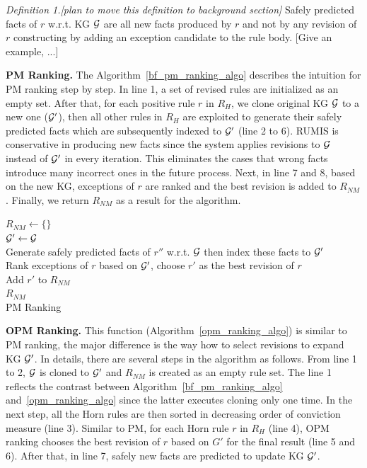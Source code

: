 \textit{Definition 1.[plan to move this definition to background section]} Safely predicted facts of $r$ w.r.t. KG $\mathcal{G}$ are all new facts produced by $r$ and not by any revision of $r$ constructing by adding an exception candidate to the rule body. [Give an example, ...]

\textbf{PM Ranking.} The Algorithm~\ref{bf_pm_ranking_algo} describes the intuition for PM ranking step by step. In line 1, a set of revised rules are initialized as an empty set. After that, for each positive rule $r$ in $R_H$, we clone original KG $\mathcal{G}$ to a new one ($\mathcal{G}'$), then all other rules in $R_H$ are exploited to generate their safely predicted facts which are subsequently indexed to $\mathcal{G}'$ (line 2 to 6). RUMIS is conservative in producing new facts since the system applies revisions to $\mathcal{G}$ instead of $\mathcal{G}'$ in every iteration. This eliminates the cases that wrong facts introduce many incorrect ones in the future process. Next, in line 7 and 8, based on the new KG, exceptions of $r$ are ranked and the best revision is added to $R_{NM}$. Finally, we return $R_{NM}$ as a result for the algorithm.

\IncMargin{1.5em}
\begin{algorithm}[H]
\DontPrintSemicolon
\SetAlgoLined
{}
\BlankLine
$R_{NM} \leftarrow \{\}$\\
\BlankLine
{} {
	$\mathcal{G}' \leftarrow \mathcal{G}$\\
	 {
		Generate safely predicted facts of $r''$ w.r.t. $\mathcal{G}$ then index these facts to $\mathcal{G}'$\\
	}
	Rank exceptions of $r$ based on $\mathcal{G}'$, choose $r'$ as the best revision of $r$\\
	Add $r'$ to $R_{NM}$\\
}
\Return $R_{NM}$\\
\caption{PM Ranking}
\label{bf_pm_ranking_algo}
\end{algorithm}
\DecMargin{1.5em}

\textbf{OPM Ranking.} This function (Algorithm~\ref{opm_ranking_algo}) is similar to PM ranking, the major difference is the way how to select revisions to expand KG $\mathcal{G}'$. In details, there are several steps in the algorithm as follows. From line 1 to 2, $\mathcal{G}$ is cloned to $\mathcal{G}'$ and $R_{NM}$ is created as an empty rule set. The line 1 reflects the contrast between Algorithm~\ref{bf_pm_ranking_algo} and~\ref{opm_ranking_algo} since the latter executes cloning only one time. In the next step, all the Horn rules are then sorted in decreasing order of conviction measure (line 3). Similar to PM, for each Horn rule $r$ in $R_H$ (line 4), OPM ranking chooses the best revision of $r$ based on $G'$ for the final result (line 5 and 6). After that, in line 7, safely new facts are predicted to update KG $\mathcal{G}'$.

